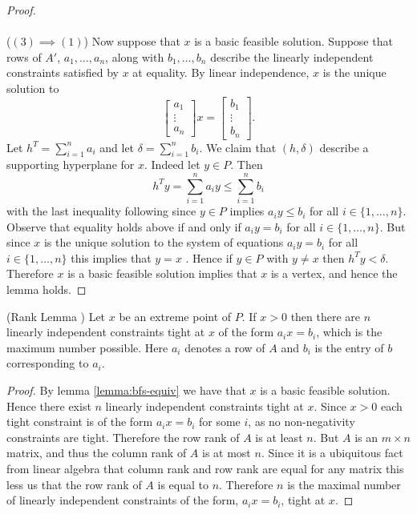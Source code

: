 \begin{proof}
\paragraph{}
($(3) \implies (1)$) Now suppose that $x$ is a basic feasible solution. Suppose that rows of $A'$, $a_1, \dots, a_n$, along with $b_1, \dots, b_n$ describe the linearly independent constraints satisfied by $x$ at equality. By linear independence, $x$ is the unique solution to 
$$\begin{bmatrix} a_1 \\ \vdots \\ a_n \end{bmatrix} x = \begin{bmatrix} b_1 \\ \vdots \\ b_n \end{bmatrix}.$$
Let $h^T = \sum_{i=1}^n a_i$ and let $\delta = \sum_{i=1}^n b_i$. We claim that $(h, \delta)$ describe a supporting hyperplane for $x$. Indeed let $y \in P$. Then 
$$ h^T y = \sum_{i=1}^n a_i y \leq \sum_{i=1}^n b_i$$
with the last inequality following since $y \in P$ implies $a_i y \leq b_i$ for all $i \in \{1, \dots, n\}$. Observe that equality holds above if and only if $a_i y = b_i$ for all $i\in\{1,\dots,n\}$. But since $x$ is the unique solution to the system of equations $a_i y = b_i$ for all $i\in\{1,\dots,n\}$ this implies that $y = x$ . Hence if $y \in P$ with $y \neq x$ then $h^T y < \delta$. Therefore $x$ is a basic feasible solution implies that $x$ is a vertex, and hence the lemma holds. 
\end{proof}
\begin{lemma}\label{lemma:rank}
(Rank Lemma \cite{lau2011iterative}) Let $x$ be an extreme point of $P$. If $x>0$ then there are $n$ linearly independent constraints tight at $x$ of the form $a_ix = b_i$, which is the maximum number possible. Here $a_i$ denotes a row of $A$ and $b_i$ is the entry of $b$ corresponding to $a_i$.  
\end{lemma}
\begin{proof}
By lemma \ref{lemma:bfs-equiv} we have that $x$ is a basic feasible solution. Hence there exist $n$ linearly independent constraints tight at $x$. Since $x>0$ each tight constraint is of the form $a_i x = b_i$ for some $i$, as no non-negativity constraints are tight. Therefore the row rank of $A$ is at least $n$. But $A$ is an $m \times n$ matrix, and thus the column rank of $A$ is at most $n$. Since it is a ubiquitous fact from linear algebra that column rank and row rank are equal for any matrix this less us that the row rank of $A$ is equal to $n$. Therefore $n$ is the maximal number of linearly independent constraints of the form, $a_i x = b_i$, tight at $x$.
\end{proof}
